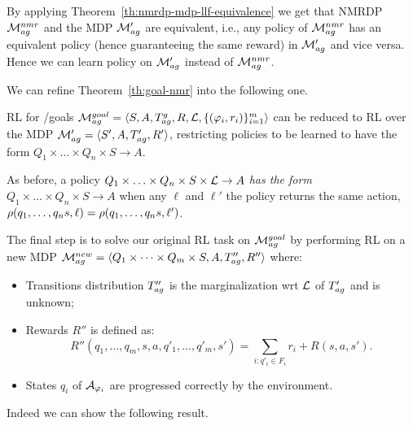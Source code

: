 By applying Theorem~\ref{th:nmrdp-mdp-llf-equivalence} we get that NMRDP $\mathcal{M}_{ag}^{nmr}$ and
the MDP $\mathcal{M}_{ag}'$ are equivalent, i.e., any policy of $\mathcal{M}_{ag}^{nmr}$
has an equivalent policy (hence guaranteeing the same reward) in
$\mathcal{M}_{ag}'$ and vice versa. Hence we can learn policy on $\mathcal{M}_{ag}'$ instead of $\mathcal{M}_{ag}^{nmr}$. 

We can refine Theorem~\ref{th:goal-nmr} into the following one.

\begin{theorem}\label{th:goal-mdp-ell}
	RL for \LTLf /\LDLf goals
	$\mathcal{M}_{ag}^{goal}= \langle S, A, T_{ag}^{g}, R, \mathcal{L},
	\{(\varphi_i,r_i)\}_{i=1}^{m} \rangle$ can be reduced to RL over the
	MDP $\mathcal{M}_{ag}'=\langle S',A,T'_{ag},R' \rangle$,
	restricting policies to be learned to have the form $Q_1\times\ldots\times Q_n\times S\rightarrow A$. %
\end{theorem}
As before, a policy $Q_1\times\ldots\times Q_n\times S \times \mathcal{L} \rightarrow A$ \emph{has the
	form} $Q_1\times\ldots\times Q_n\times S\rightarrow A$ when any
$\ell$ and $\ell'$ the policy returns the same action,
$\rho(q_1,\ldots, q_n s,\ell) = \rho(q_1,\ldots, q_n s,\ell') $.


\medskip
The final step is to
solve our original RL task on $\mathcal{M}_{ag}^{goal}$ by performing RL on a new MDP 
$\mathcal{M}_{ag}^{new}=\langle Q_1\times\cdots\times Q_m \times S,A,T''_{ag},R''\rangle$ where:
\begin{itemize}
	\item  Transitions distribution $T''_{ag}$ is the marginalization wrt $\mathcal{L}$ of $T'_{ag}$ and is unknown;
	\item  Rewards $R''$ is defined as:
	\[
	R''(q_1,\ldots,q_m, s, a, q'_1,\ldots,q'_m, s') = \sum_{i: q'_i\in F_i} r_i+R(s,a,s').
	\] 
	\item States $q_i$ of \DFAs $\mathcal{A}_{\varphi_i}$ are progressed correctly by the environment.
\end{itemize}

Indeed  we can show the following result.

